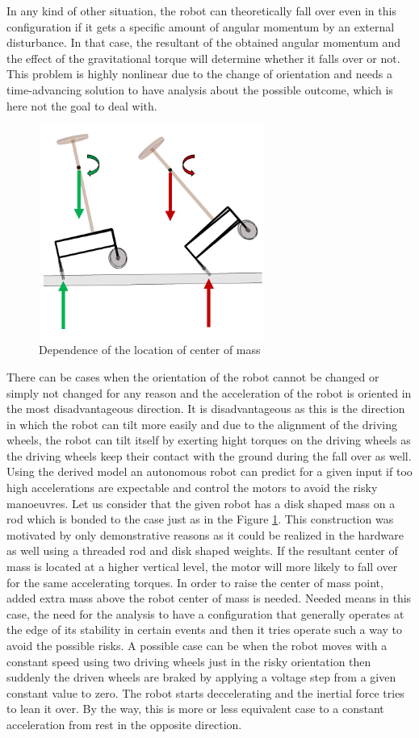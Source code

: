 \documentclass[12pt,english]{article}
\begin{document}
In any kind of other situation, the robot can theoretically fall over even in this configuration if it gets a specific amount of angular momentum by an external disturbance. In that case, the resultant of the obtained angular momentum and the effect of the gravitational torque will determine whether it falls over or not. This problem is highly nonlinear due to the change of orientation and needs a time-advancing solution to have analysis about the possible outcome, which is here not the goal to deal with.
\begin{figure}[htb!]
	\centering
	\includegraphics[height=7cm]{figures/fallover_ppt}
	\caption{Dependence of the location of center of mass}
	\label{fallover_ppt}
\end{figure}

There can be cases when the orientation of the robot cannot be changed or simply not changed for any reason and the acceleration of the robot is oriented in the most disadvantageous direction. It is disadvantageous as this is the direction in which the robot can tilt more easily and due to the alignment of the driving wheels, the robot can tilt itself by exerting hight torques on the driving wheels as the driving wheels keep their contact with the ground during the fall over as well. Using the derived model an autonomous robot can predict for a given input if too high accelerations are expectable and control the motors to avoid the risky manoeuvres. Let us consider that the given robot has a disk shaped mass on a rod which is bonded to the case just as in the Figure \ref{fallover_ppt}. This construction was motivated by only demonstrative reasons as it could be realized in the hardware as well using a threaded rod and disk shaped weights. If the resultant center of mass is located at a higher vertical level, the motor will more likely to fall over for the same accelerating torques. In order to raise the center of mass point, added extra mass above the robot center of mass is needed. Needed means in this case, the need for the analysis to have a configuration that generally operates at the edge of its stability in certain events and then it tries operate such a way to avoid the possible risks. A possible case can be when the robot moves with a constant speed using two driving wheels just in the risky orientation then suddenly the driven wheels are braked by applying a voltage step from a given constant value to zero. The robot starts deccelerating and the inertial force tries to lean it over. By the way, this is more or less equivalent case to a constant acceleration from rest in the opposite direction.
\end{document}
